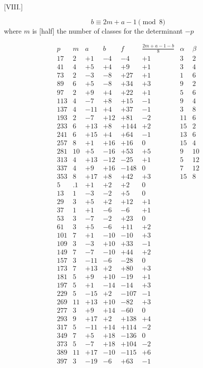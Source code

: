 \clearpage
{}
\par\bigskip{}\centerline{[VIII.]}\medskip
\[
b\equiv2m+a-1\pmod8
\]
where $m$ is [half] the number of classes for the determinant $-p$

\begingroup\small
\[
\begin{array}{r|r|r|r|r|r|r|r}
p&m&a&b&f&\frac{2m+a-1-b}8&\alpha&\beta\\\hline
17&2&+1&-4&-4&+1&3&2\\
41&4&+5&+4&+9&+1&3&4\\
73&2&-3&-8&+27&+1&1&6\\
89&6&+5&-8&+34&+3&9&2\\
97&2&+9&+4&+22&+1&5&6\\
113&4&-7&+8&+15&-1&9&4\\
137&4&-11&+4&+37&-1&3&8\\
193&2&-7&+12&+81&-2&11&6\\
233&6&+13&+8&+144&+2&15&2\\
241&6&+15&+4&+64&-1&13&6\\
257&8&+1&+16&+16&0&15&4\\
281&10&+5&-16&+53&+5&9&10\\
313&4&+13&-12&-25&+1&5&12\\
337&4&+9&+16&-148&0&7&12\\
353&8&+17&+8&+42&+3&15&8\\
5&.1&+1&+2&+2&0&&\\
13&1&-3&-2&+5&0&&\\
29&3&+5&+2&+12&+1&&\\
37&1&+1&-6&-6&+1&&\\
53&3&-7&-2&+23&0&&\\
61&3&+5&-6&+11&+2&&\\
101&7&+1&-10&-10&+3&&\\
109&3&-3&+10&+33&-1&&\\
149&7&-7&-10&+44&+2&&\\
157&3&-11&-6&-28&0&&\\
173&7&+13&+2&+80&+3&&\\
181&5&+9&+10&-19&+1&&\\
197&5&+1&-14&-14&+3&&\\
229&5&-15&+2&-107&-1&&\\
269&11&+13&+10&-82&+3&&\\
277&3&+9&+14&-60&0&&\\
293&9&+17&+2&+138&+4&&\\
317&5&-11&+14&+114&-2&&\\
349&7&+5&+18&-136&0&&\\
373&5&-7&+18&+104&-2&&\\
389&11&+17&-10&-115&+6&&\\
397&3&-19&-6&+63&-1&&
\end{array}
\]
\endgroup
{}
